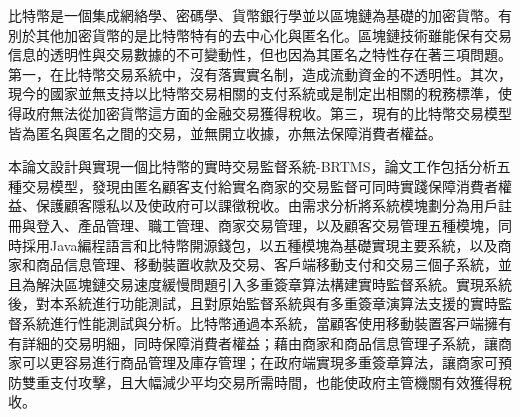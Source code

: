 
\begin{cabstract}

	⽐特幣是⼀個集成網絡學、密碼學、貨幣銀⾏學並以區塊鏈為基礎的加密貨幣。有別於其他加密貨幣的是⽐特幣特有的去中⼼化與匿名化。區塊鏈技術雖能保有交易信息的透明性與交易數據的不可變動性，但也因為其匿名之特性存在著三項問題。第一，在⽐特幣交易系統中，沒有落實實名制，造成流動資金的不透明性。其次，現今的國家並無⽀持以⽐特幣交易相關的⽀付系統或是制定出相關的稅務標準，使得政府無法從加密貨幣這⽅⾯的⾦融交易獲得稅收。第三，現有的⽐特幣交易模型皆為匿名與匿名之間的交易，並無開⽴收據，亦無法保障消費者權益。

	本論⽂設計與實現⼀個比特幣的實時交易監督系統-BRTMS，論文工作包括分析五種交易模型，發現由匿名顧客支付給實名商家的交易監督可同時實踐保障消費者權益、保護顧客隱私以及使政府可以課徵稅收。由需求分析將系統模塊劃分為用戶註冊與登入、產品管理、職工管理、商家交易管理，以及顧客交易管理五種模塊，同時採用Java編程語言和比特幣開源錢包，以五種模塊為基礎實現主要系統，以及商家和商品信息管理、移動裝置收款及交易、客戶端移動支付和交易三個子系統，並且為解決區塊鏈交易速度緩慢問題引入多重簽章算法構建實時監督系統。實現系統後，對本系統進行功能測試，且對原始監督系統與有多重簽章演算法支援的實時監督系統進行性能測試與分析。比特幣通過本系統，當顧客使用移動裝置客⼾端擁有有詳細的交易明細，同時保障消費者權益；藉由商家和商品信息管理子系統，讓商家可以更容易進⾏商品管理及庫存管理；在政府端實現多重簽章算法，讓商家可預防雙重⽀付攻擊，且大幅減少平均交易所需時間，也能使政府主管機關有效獲得稅收。



\end{cabstract}

